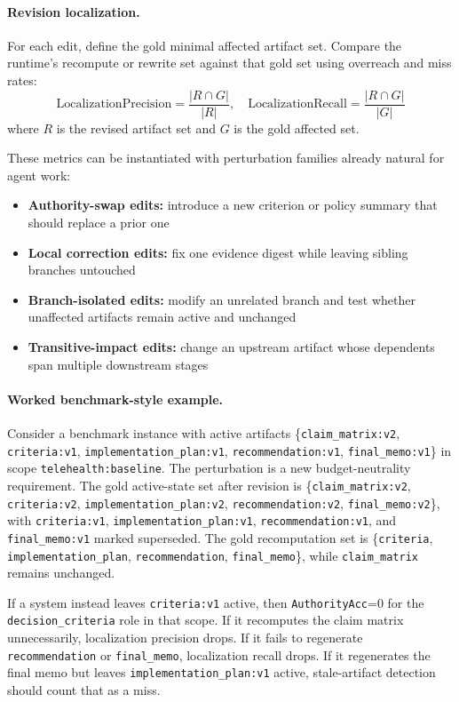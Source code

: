 \documentclass{article}
\begin{document}
\paragraph{Revision localization.} For each edit, define the gold minimal affected artifact set. Compare the runtime's recompute or rewrite set against that gold set using overreach and miss rates:
\begin{equation}
\mathrm{LocalizationPrecision} = \frac{|R \cap G|}{|R|}, \quad
\mathrm{LocalizationRecall} = \frac{|R \cap G|}{|G|}
\end{equation}
where $R$ is the revised artifact set and $G$ is the gold affected set.

These metrics can be instantiated with perturbation families already natural for agent work:
\begin{itemize}
\item \textbf{Authority-swap edits:} introduce a new criterion or policy summary that should replace a prior one
\item \textbf{Local correction edits:} fix one evidence digest while leaving sibling branches untouched
\item \textbf{Branch-isolated edits:} modify an unrelated branch and test whether unaffected artifacts remain active and unchanged
\item \textbf{Transitive-impact edits:} change an upstream artifact whose dependents span multiple downstream stages
\end{itemize}

\paragraph{Worked benchmark-style example.} Consider a benchmark instance with active artifacts
\{\texttt{claim\_matrix:v2}, \texttt{criteria:v1}, \texttt{implementation\_plan:v1}, \texttt{recommendation:v1}, \texttt{final\_memo:v1}\}
in scope \texttt{telehealth:baseline}. The perturbation is a new budget-neutrality requirement. The gold active-state set after revision is
\{\texttt{claim\_matrix:v2}, \texttt{criteria:v2}, \texttt{implementation\_plan:v2}, \texttt{recommendation:v2}, \texttt{final\_memo:v2}\},
with \texttt{criteria:v1}, \texttt{implementation\_plan:v1}, \texttt{recommendation:v1}, and \texttt{final\_memo:v1} marked superseded. The gold recomputation set is
\{\texttt{criteria}, \texttt{implementation\_plan}, \texttt{recommendation}, \texttt{final\_memo}\},
while \texttt{claim\_matrix} remains unchanged.

If a system instead leaves \texttt{criteria:v1} active, then \texttt{AuthorityAcc}=0 for the \texttt{decision\_criteria} role in that scope. If it recomputes the claim matrix unnecessarily, localization precision drops. If it fails to regenerate \texttt{recommendation} or \texttt{final\_memo}, localization recall drops. If it regenerates the final memo but leaves \texttt{implementation\_plan:v1} active, stale-artifact detection should count that as a miss.
\end{document}
